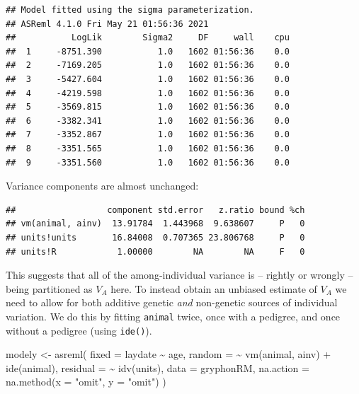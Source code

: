 \documentclass[
  12pt,
]{book}
\newenvironment{Shaded}{\begin{snugshade}}{\end{snugshade}}
\newcommand{\AttributeTok}[1]{\textcolor[rgb]{0.77,0.63,0.00}{#1}}
\newcommand{\FunctionTok}[1]{\textcolor[rgb]{0.00,0.00,0.00}{#1}}
\newcommand{\NormalTok}[1]{#1}
\newcommand{\OtherTok}[1]{\textcolor[rgb]{0.56,0.35,0.01}{#1}}
\newcommand{\SpecialCharTok}[1]{\textcolor[rgb]{0.00,0.00,0.00}{#1}}
\newcommand{\StringTok}[1]{\textcolor[rgb]{0.31,0.60,0.02}{#1}}
\begin{document}
\begin{verbatim}
## Model fitted using the sigma parameterization.
## ASReml 4.1.0 Fri May 21 01:56:36 2021
##           LogLik        Sigma2     DF     wall    cpu
##  1     -8751.390           1.0   1602 01:56:36    0.0
##  2     -7169.205           1.0   1602 01:56:36    0.0
##  3     -5427.604           1.0   1602 01:56:36    0.0
##  4     -4219.598           1.0   1602 01:56:36    0.0
##  5     -3569.815           1.0   1602 01:56:36    0.0
##  6     -3382.341           1.0   1602 01:56:36    0.0
##  7     -3352.867           1.0   1602 01:56:36    0.0
##  8     -3351.565           1.0   1602 01:56:36    0.0
##  9     -3351.560           1.0   1602 01:56:36    0.0
\end{verbatim}

Variance components are almost unchanged:

\begin{Shaded}
\end{Shaded}

\begin{verbatim}
##                  component std.error   z.ratio bound %ch
## vm(animal, ainv)  13.91784  1.443968  9.638607     P   0
## units!units       16.84008  0.707365 23.806768     P   0
## units!R            1.00000        NA        NA     F   0
\end{verbatim}

This suggests that all of the among-individual variance is -- rightly or wrongly -- being partitioned as \(V_A\) here. To instead obtain an unbiased estimate of \(V_A\) we need to allow for both additive genetic \emph{and} non-genetic sources of individual variation. We do this by fitting \texttt{animal} twice, once with a pedigree, and once without a pedigree (using \texttt{ide()}).

\begin{Shaded}
\begin{Highlighting}[]
\NormalTok{modely }\OtherTok{\textless{}{-}} \FunctionTok{asreml}\NormalTok{(}
  \AttributeTok{fixed =}\NormalTok{ laydate }\SpecialCharTok{\textasciitilde{}}\NormalTok{ age,}
  \AttributeTok{random =} \SpecialCharTok{\textasciitilde{}} \FunctionTok{vm}\NormalTok{(animal, ainv) }\SpecialCharTok{+} \FunctionTok{ide}\NormalTok{(animal),}
  \AttributeTok{residual =} \SpecialCharTok{\textasciitilde{}} \FunctionTok{idv}\NormalTok{(units),}
  \AttributeTok{data =}\NormalTok{ gryphonRM,}
  \AttributeTok{na.action =} \FunctionTok{na.method}\NormalTok{(}\AttributeTok{x =} \StringTok{"omit"}\NormalTok{, }\AttributeTok{y =} \StringTok{"omit"}\NormalTok{)}
\NormalTok{)}
\end{Highlighting}
\end{Shaded}
\end{document}
